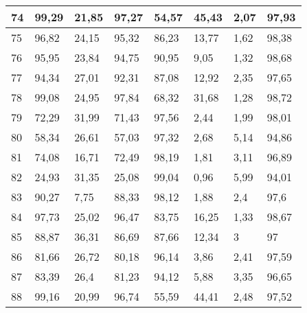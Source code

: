 \begin{longtable}[c]{|l|l|l|l|l|l|l|l|}
74              & 99,29        & 21,85        & 97,27       & 54,57         & 45,43         & 2,07          & 97,93         \\ \hline
75              & 96,82        & 24,15        & 95,32       & 86,23         & 13,77         & 1,62          & 98,38         \\ \hline
76              & 95,95        & 23,84        & 94,75       & 90,95         & 9,05          & 1,32          & 98,68         \\ \hline
77              & 94,34        & 27,01        & 92,31       & 87,08         & 12,92         & 2,35          & 97,65         \\ \hline
78              & 99,08        & 24,95        & 97,84       & 68,32         & 31,68         & 1,28          & 98,72         \\ \hline
79              & 72,29        & 31,99        & 71,43       & 97,56         & 2,44          & 1,99          & 98,01         \\ \hline
80              & 58,34        & 26,61        & 57,03       & 97,32         & 2,68          & 5,14          & 94,86         \\ \hline
81              & 74,08        & 16,71        & 72,49       & 98,19         & 1,81          & 3,11          & 96,89         \\ \hline
82              & 24,93        & 31,35        & 25,08       & 99,04         & 0,96          & 5,99          & 94,01         \\ \hline
83              & 90,27        & 7,75         & 88,33       & 98,12         & 1,88          & 2,4           & 97,6          \\ \hline
84              & 97,73        & 25,02        & 96,47       & 83,75         & 16,25         & 1,33          & 98,67         \\ \hline
85              & 88,87        & 36,31        & 86,69       & 87,66         & 12,34         & 3             & 97            \\ \hline
86              & 81,66        & 26,72        & 80,18       & 96,14         & 3,86          & 2,41          & 97,59         \\ \hline
87              & 83,39        & 26,4         & 81,23       & 94,12         & 5,88          & 3,35          & 96,65         \\ \hline
88              & 99,16        & 20,99        & 96,74       & 55,59         & 44,41         & 2,48          & 97,52         \\ \hline

\end{longtable}
